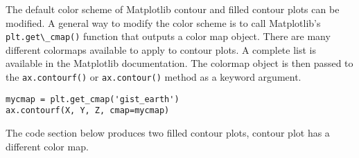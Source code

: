 \documentclass{book}
\newcommand{\passthrough}[1]{#1}
\begin{document}
    
        The default color scheme of Matplotlib contour and filled contour plots
can be modified. A general way to modify the color scheme is to call
Matplotlib's \passthrough{\lstinline!plt.get\_cmap()!} function that
outputs a color map object. There are many different colormaps available
to apply to contour plots. A complete list is available in the
Matplotlib documentation. The colormap object is then passed to the
\passthrough{\lstinline!ax.contourf()!} or
\passthrough{\lstinline!ax.contour()!} method as a keyword argument.

\begin{lstlisting}
mycmap = plt.get_cmap('gist_earth')
ax.contourf(X, Y, Z, cmap=mycmap)
\end{lstlisting}

The code section below produces two filled contour plots, contour plot
has a different color map.
    
\end{document}
